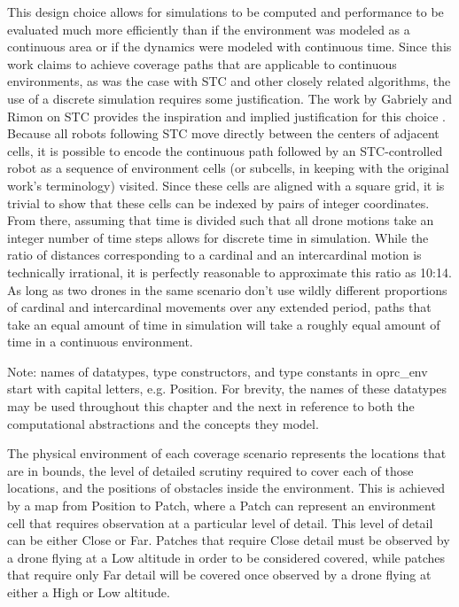 This design choice allows for simulations to be computed and performance to be evaluated much more efficiently than if the environment was modeled as a continuous area or if the dynamics were modeled with continuous time. Since this work claims to achieve coverage paths that are applicable to continuous environments, as was the case with STC and other closely related algorithms, the use of a discrete simulation requires some justification. The work by Gabriely and Rimon on STC provides the inspiration and implied justification for this choice \cite{STC}. Because all robots following STC move directly between the centers of adjacent cells, it is possible to encode the continuous path followed by an STC-controlled robot as a sequence of environment cells (or subcells, in keeping with the original work's terminology) visited. Since these cells are aligned with a square grid, it is trivial to show that these cells can be indexed by pairs of integer coordinates. From there, assuming that time is divided such that all drone motions take an integer number of time steps allows for discrete time in simulation. While the ratio of distances corresponding to a cardinal and an intercardinal motion is technically irrational, it is perfectly reasonable to approximate this ratio as 10:14. As long as two drones in the same scenario don't use wildly different proportions of cardinal and intercardinal movements over any extended period, paths that take an equal amount of time in simulation will take a roughly equal amount of time in a continuous environment.

Note: names of datatypes, type constructors, and type constants in oprc\_env start with capital letters, e.g. Position. For brevity, the names of these datatypes may be used throughout this chapter and the next in reference to both the computational abstractions and the concepts they model.

The physical environment of each coverage scenario represents the locations that are in bounds, the level of detailed scrutiny required to cover each of those locations, and the positions of obstacles inside the environment. This is achieved by a map from Position to Patch, where a Patch can represent an environment cell that requires observation at a particular level of detail. This level of detail can be either Close or Far. Patches that require Close detail must be observed by a drone flying at a Low altitude in order to be considered covered, while patches that require only Far detail will be covered once observed by a drone flying at either a High or Low altitude.

